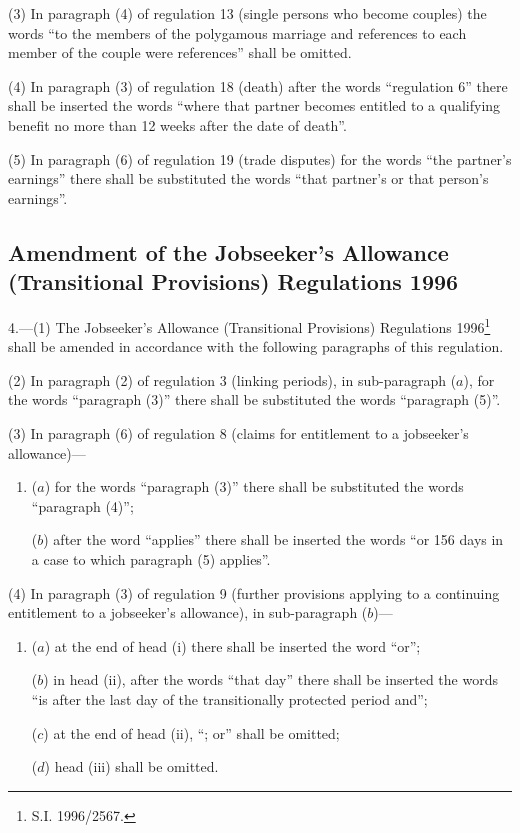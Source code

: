 \documentclass[12pt,a4paper]{article}
\begin{document}
(3) In paragraph (4) of regulation 13 (single persons who become couples) the words “to the members of the polygamous marriage and references to each member of the couple were references” shall be omitted.

(4) In paragraph (3) of regulation 18 (death) after the words “regulation 6” there shall be inserted the words “where that partner becomes entitled to a qualifying benefit no more than 12 weeks after the date of death”.

(5) In paragraph (6) of regulation 19 (trade disputes) for the words “the partner’s earnings” there shall be substituted the words “that partner’s or that person’s earnings”.

\subsection[4. Amendment of the Jobseeker’s Allowance (Transitional Provisions) Regulations 1996]{Amendment of the Jobseeker’s Allowance (Transitional Provisions) Regulations 1996}

4.---(1)  The Jobseeker’s Allowance (Transitional Provisions) Regulations 1996\footnote{\frenchspacing S.I. 1996/2567.} shall be amended in accordance with the following paragraphs of this regulation.

(2) In paragraph (2) of regulation 3 (linking periods), in sub-paragraph ($a$), for the words “paragraph (3)” there shall be substituted the words “paragraph (5)”.

(3) In paragraph (6) of regulation 8 (claims for entitlement to a jobseeker’s allowance)—
\begin{enumerate}\item[]
($a$) for the words “paragraph (3)” there shall be substituted the words “paragraph (4)”;

($b$) after the word “applies” there shall be inserted the words “or 156 days in a case to which paragraph (5) applies”.
\end{enumerate}

(4) In paragraph (3) of regulation 9 (further provisions applying to a continuing entitlement to a jobseeker’s allowance), in sub-paragraph ($b$)—
\begin{enumerate}\item[]
($a$) at the end of head (i)  there shall be inserted the word “or”;

($b$) in head (ii), after the words “that day” there shall be inserted the words “is after the last day of the transitionally protected period and”;

($c$) at the end of head (ii), “; or” shall be omitted;

($d$) head (iii) shall be omitted.
\end{enumerate}
\end{document}
